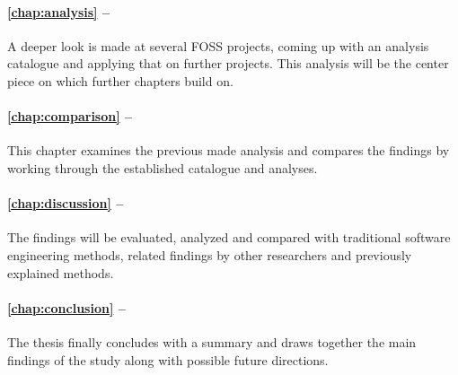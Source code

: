 \paragraph{\autoref{chap:analysis} -- }

A deeper look is made at several \ac{FOSS} projects, coming up with an analysis
catalogue and applying that on further projects. This analysis will be the
center piece on which further chapters build on.

\paragraph{\autoref{chap:comparison} -- }

This chapter examines the previous made analysis and compares the findings by
working through the established catalogue and analyses.

\paragraph{\autoref{chap:discussion} -- }

The findings will be evaluated, analyzed and compared with traditional software
engineering methods, related findings by other researchers and previously
explained methods.

\paragraph{\autoref{chap:conclusion} -- }

The thesis finally concludes with a summary and draws together the main
findings of the study along with possible future directions.


